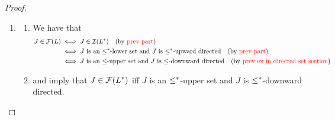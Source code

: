 \documentclass{book}
\begin{document}
\begin{proof}
\begin{enumerate}
\begin{enumerate}
\begin{itemize}
\begin{enumerate}
						\item Let $a,b \in J$. Since $(J, \leq|_J)$ is a directed set and $\{a,b\} \subset J$, we have that 
						\begin{align*}
							\ubd(\{a,b\}, \leq) \cap J
							& = \ubd(\{a,b\}, \leq|_J) \quad \text{(by \rex{ex:ordered_sets:suprema_infima:upper_lower_bnds:0006})} \\
							& \neq \varnothing.
						\end{align*}
						Thus there exists
						\begin{align}
							c 
							& \in \ubd(\{a,b\}, \leq) \cap J \\
							& \subset \ubd(\{a,b\}, \leq).
						\end{align}
						Therefore $\sup(\{a,b\}, \leq) \leq c$. Since $J$ is a $\leq$-lower set, $c \in J$ and $\sup(\{a,b\}, \leq) \leq c$, we have that 
						\begin{align*}
							a \vee b
							& = \sup(\{a,b\}, \leq) \\
							& \in J.
						\end{align*}
						Since $a,b \in J$ are arbitrary, we have that for each $a,b \in J$, $a \vee b \in J$.
						\item Let $x \in L$ and $a \in J$. Then $x \wedge a \leq a$. Since $J$ is a $\leq$-lower set, $x \wedge a \in J$. Since $x \in L$ and $a \in J$ are arbitrary, we have that for each $x \in L$ and $a \in J$, $x \wedge a \in J$.
					\end{enumerate}
					Therefore $J \in \MI(L)$.
				\end{itemize}
				\item 
				
				
				 and  imply that $J \in \MI(L^*)$ iff $J$ is an $\lop$-lower set and $J$ is $\lop$-upward directed.
			\end{enumerate}
			\item 
			\begin{enumerate}
				\item We have that 
				\begin{align*}
					J \in \mathcal{F}(L)
					& \iff J \in \mathcal{I}(L^*) \quad \text{(by \textcolor{red}{prev part})} \\
					& \iff \text{$J$ is an $\leq^*$-lower set and $J$ is $\leq^*$-upward directed} \quad \text{(by \textcolor{red}{prev part})} \\
					& \iff \text{$J$ is an $\leq$-upper set and $J$ is $\leq$-downward directed} \quad \text{(by \textcolor{red}{prev ex in directed set section})} \\
				\end{align*}
				\item {} and  imply that $J \in \mathcal{F}(L^*)$ iff $J$ is an $\lop$-upper set and $J$ is $\lop$-downward directed.
				

\end{enumerate}
\end{enumerate}
\end{proof}
\end{document}
